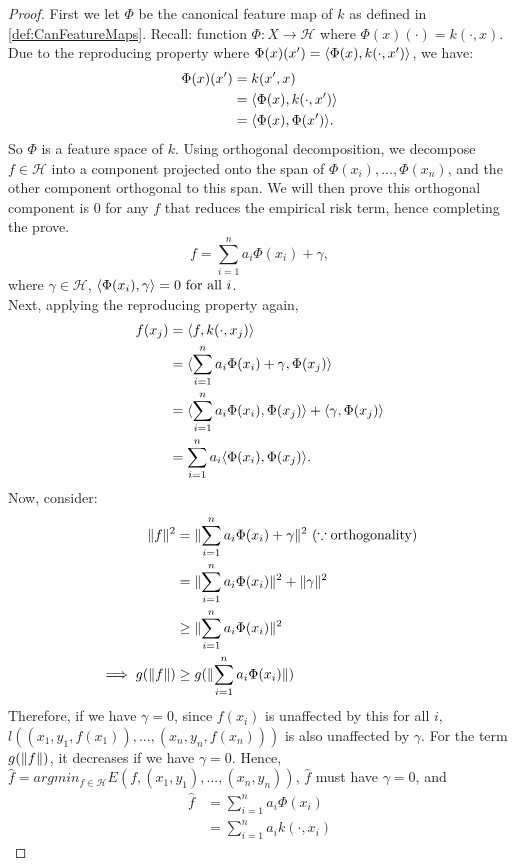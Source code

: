 \documentclass[twoside]{memoir}
\begin{document}
	\begin{proof}
		First we let $\Phi$ be the canonical feature map of $k$ as defined in \ref{def:CanFeatureMaps}. Recall: function $\Phi: X \rightarrow \mathcal{H}$ where $\Phi(x)(\cdot) = k(\cdot , x)$. Due to the reproducing property where $\Phi(x)(x') = \langle\Phi(x), k(\cdot, x')\rangle$, we have:
		\begin{equation*}
		\begin{split}
		\Phi(x)(x') &= k(x', x) \\
		&= \langle\Phi(x), k(\cdot, x')\rangle \\
		&= \langle\Phi(x), \Phi(x')\rangle. 
		\end{split}
		\end{equation*}
		So $\Phi$ is a feature space of $k$. Using orthogonal decomposition, we decompose $f \in \mathcal{H}$ into a component projected onto the span of ${\Phi(x_i), ..., \Phi(x_n)}$, and the other component orthogonal to this span. We will then prove this orthogonal component is $0$ for any $f$ that reduces the empirical risk  term, hence completing the prove.
		\[ f = \sum_{i=1}^{n} a_i \Phi(x_i) + \gamma, \]
		where $\gamma \in \mathcal{H}$, $\langle\Phi(x_i), \gamma\rangle = 0 \text{ for all } i$.\\
		Next, applying the reproducing property again,
		\begin{equation*}
		\begin{split}
		f(x_j) &= \langle f, k(\cdot, x_j)\rangle \\
		&= \langle\sum_{i=1}^{n} a_i \Phi(x_i) + \gamma, \Phi(x_j)\rangle \\
		&= \langle\sum_{i=1}^{n} a_i \Phi(x_i),  \Phi(x_j)\rangle + \langle\gamma,  \Phi(x_j)\rangle \\
		&= \sum_{i=1}^{n} a_i \langle\Phi(x_i),  \Phi(x_j)\rangle.
		\end{split}
		\end{equation*}
		Now, consider:
		\begin{equation*}
		\begin{split}
		\lVert f\rVert^2 &= \lVert\sum_{i=1}^{n} a_i \Phi(x_i) + \gamma\rVert^2 ~ (\because \text{orthogonality})\\
		&=  \lVert\sum_{i=1}^{n} a_i \Phi(x_i)\rVert^2 + \lVert\gamma\rVert^2 \\
		&\geq \lVert\sum_{i=1}^{n} a_i \Phi(x_i)\rVert^2 \\
		\implies g(\lVert f\rVert) &\geq g(\lVert\sum_{i=1}^{n} a_i \Phi(x_i)\rVert)
		\end{split}
		\end{equation*}
		Therefore, if we have $\gamma = 0$, since $f(x_i)$ is unaffected by this for all $i$, 
		$l((x_1, y_1, f(x_1)), ..., (x_n, y_n, f(x_n)))$ is also unaffected by $\gamma$. For the term $g(\lVert f\rVert)$, it decreases if we have $\gamma = 0$. Hence,  $\hat{f} = argmin_{f \in \mathcal{H}} E(f, (x_1, y_1), ..., (x_n, y_n))$, $\hat{f}$ must have $\gamma = 0$, and 
		\begin{equation*}
		\begin{split}
		\hat{f} &= \sum_{i=1}^{n} a_i \Phi(x_i) \\
		&=  \sum_{i=1}^{n} a_i k(\cdot, x_i)
		\end{split}
		\end{equation*}
	\end{proof}
	
\end{document}
